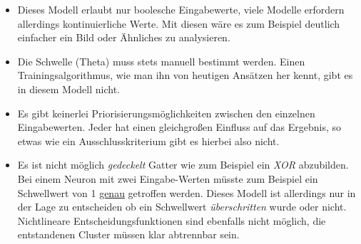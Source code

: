 \begin{minipage}{\textwidth}
\begin{itemize}

\item Dieses Modell  erlaubt nur boolesche Eingabewerte, viele Modelle erfordern allerdings kontinuierliche Werte. Mit diesen wäre es zum Beispiel deutlich einfacher ein Bild oder Ähnliches zu analysieren.

\item Die Schwelle (Theta) muss stets manuell bestimmt werden. Einen Trainingsalgorithmus, wie man ihn von heutigen Ansätzen her kennt, gibt es in diesem Modell nicht. 

\item Es gibt keinerlei Priorisierungsmöglichkeiten zwischen den einzelnen Eingabewerten. Jeder hat einen gleichgroßen Einfluss auf das Ergebnis, so etwas wie ein Ausschlusskriterium gibt es hierbei also nicht. 

\item Es ist nicht möglich \emph{gedeckelt} Gatter wie zum Beispiel ein \emph{XOR} abzubilden. Bei einem Neuron mit zwei Eingabe-Werten müsste zum Beispiel ein Schwellwert von 1 \underline{genau} getroffen werden. Dieses Modell ist allerdings nur in der Lage zu entscheiden ob ein Schwellwert \emph{überschritten} wurde oder nicht. Nichtlineare Entscheidungsfunktionen sind ebenfalls nicht möglich, die entstandenen Cluster müssen klar abtrennbar sein. 

\end{itemize}
\end{minipage}

